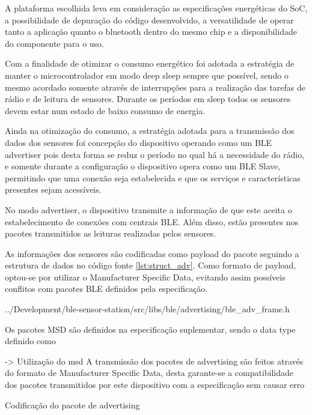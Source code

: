 A plataforma escolhida leva em consideração as especificações energéticas do
SoC, a possibilidade de depuração do código desenvolvido, a versatilidade de
operar tanto a aplicação quanto o bluetooth dentro do mesmo chip e a
disponibilidade do componente para o uso.

Com a finalidade de otimizar o consumo energético foi adotada a estratégia de
manter o microcontrolador em modo deep sleep sempre que possível, sendo o mesmo
acordado somente através de interrupções para a realização das tarefas de rádio
e de leitura de sensores. Durante os períodos em sleep todos os sensores devem
estar num estado de baixo consumo de energia.

Ainda na otimização do consumo, a estratégia adotada para a transmissão dos
dados dos sensores foi concepção do dispositivo operando como um BLE advertiser
pois desta forma se reduz o período no qual há a necessidade do rádio, e
somente durante a configuração o dispositivo opera como um BLE Slave,
permitindo que uma conexão seja estabelecida e que os serviços e
características presentes sejam acessíveis.

No modo advertiser, o dispositivo transmite a informação de que este aceita o
estabelecimento de conexões com centrais BLE. Além disso, estão presentes nos
pacotes transmitidos as leituras realizadas pelos sensores.

As informações dos sensores são codificadas como payload do pacote seguindo a
estrutura de dados no código fonte \ref{lst:struct_adv}. Como formato de
payload, optou-se por utilizar o Manufacturer Specific Data, evitando assim
possíveis conflitos com pacotes BLE definidos pela especificação.


{../Development/ble-sensor-station/src/libs/ble/advertising/ble_adv_frame.h}

Os pacotes MSD são definidos na especificação suplementar, sendo o data type
definido como  

-> Utilização do msd
A transmissão dos pacotes de advertising são feitos através do formato de
Manufacturer Specific Data, desta garante-se a compatibilidade dos pacotes
transmitidos por este dispositivo com a especificação sem causar erro

Codificação do pacote de advertising


